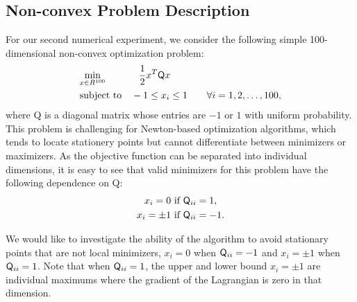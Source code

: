 \subsection{Non-convex Problem Description}
For our second numerical experiment, we consider the following simple 100-dimensional non-convex optimization problem:
\begin{equation*}
\begin{aligned}
&\underset{x \in R^{100}} {\text{min}}  
& &\phantom{-} \frac{1}{2}x^T \mathsf{Q} x \\
  & {\text{subject to}}
& &-1 \leq x_i \leq 1 \qquad \forall i = 1,2,\ldots,100, \\
\end{aligned}
\end{equation*}
where Q is a diagonal matrix whose entries are $-1$ or $1$ with uniform probability.
This problem is challenging for Newton-based optimization algorithms, which 
tends to locate stationery points  but cannot differentiate between 
minimizers or maximizers. As the objective function can be separated into 
individual dimensions, it is easy to see that 
valid minimizers for this problem have the following dependence on Q:
\begin{equation}\label{eq:pattern2}
  \begin{gathered}
  x_i=0  \text{~if~}  \mathsf{Q}_{ii} = 1,  \\
  x_i = \pm 1  \text{~if~}  \mathsf{Q}_{ii} = -1.
  \end{gathered}
\end{equation}

We would like to investigate
the ability of the algorithm to avoid stationary points that are not local minimizers, 
\eg $x_i = 0$ 
when $\mathsf{Q}_{ii} = -1$ and $x_i = \pm 1$ when $\mathsf{Q}_{ii} = 1$.
Note that when $\mathsf{Q}_{ii} = 1$, the upper and lower bound $x_i = \pm 1$ are 
individual maximums where the gradient of the Lagrangian is zero in that dimension. 

